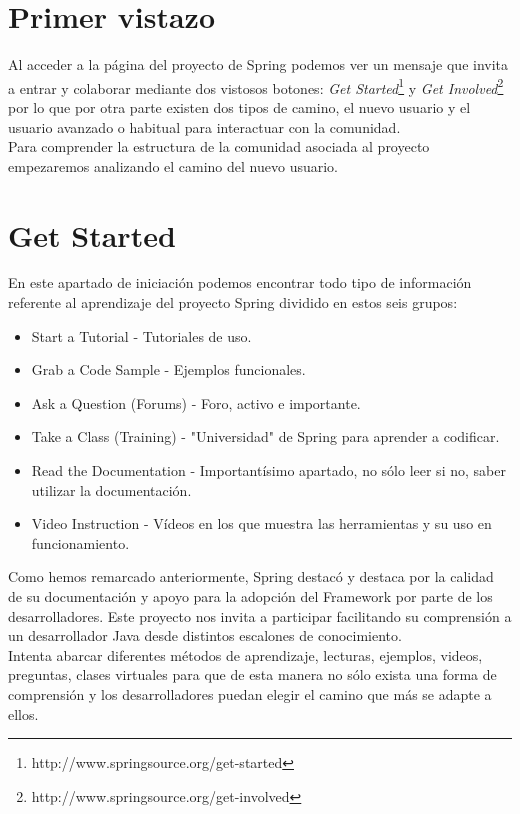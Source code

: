 \documentclass[11pt]{scrartcl}
\begin{document}
\section{Primer vistazo}

Al acceder a la p\'agina del proyecto de Spring podemos ver un mensaje que invita a entrar y colaborar mediante dos vistosos botones: \emph{Get Started}\footnote{http://www.springsource.org/get-started} y \emph{Get Involved}\footnote{http://www.springsource.org/get-involved} por lo que por otra parte existen dos tipos de camino, el nuevo usuario y el usuario avanzado o habitual para interactuar con la comunidad.\\

Para comprender la estructura de la comunidad asociada al proyecto empezaremos analizando el camino del nuevo usuario.

\section{Get Started}

En este apartado de iniciaci\'on podemos encontrar todo tipo de informaci\'on referente al aprendizaje del proyecto Spring dividido en estos seis grupos:

\begin{itemize}
    \item Start a Tutorial - Tutoriales de uso.
    \item Grab a Code Sample - Ejemplos funcionales.
    \item Ask a Question (Forums) - Foro, activo e importante.
    \item Take a Class (Training) - "Universidad" de Spring para aprender a codificar.
    \item Read the Documentation - Important\'isimo apartado, no s\'olo leer si no, saber utilizar la documentaci\'on.
    \item Video Instruction - V\'ideos en los que muestra las herramientas y su uso en funcionamiento.
\end{itemize}

Como hemos remarcado anteriormente, Spring destac\'o y destaca por la calidad de su documentaci\'on y apoyo para la adopci\'on del Framework por parte de los desarrolladores.
Este proyecto nos invita a participar facilitando su comprensi\'on a un desarrollador Java desde distintos escalones de conocimiento.\\

Intenta abarcar diferentes m\'etodos de aprendizaje, lecturas, ejemplos, videos, preguntas, clases virtuales para que de esta manera no s\'olo exista una forma de comprensi\'on y los desarrolladores puedan elegir el camino que m\'as se adapte a ellos.\\
\end{document}
